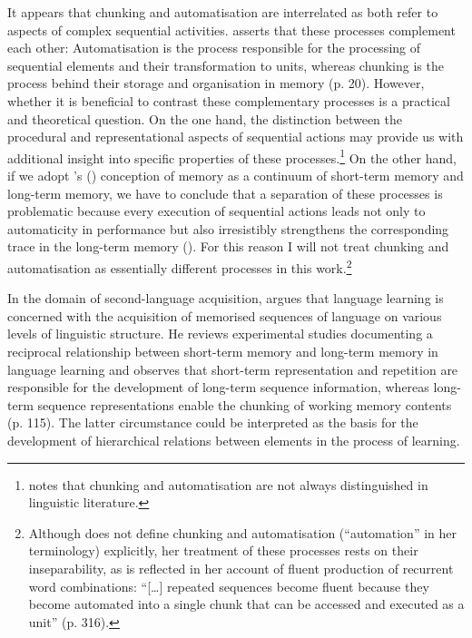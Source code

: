 \noindent It appears that chunking and automatisation are interrelated as both refer to aspects of complex sequential activities. \citeauthor{diessel-toappear} asserts that these processes complement each other: Automatisation is the process responsible for the processing of sequential elements and their transformation to units, whereas chunking is the process behind their storage and organisation in memory (p. 20). However, whether it is beneficial to contrast these complementary processes is a practical and theoretical question. On the one hand, the distinction between the procedural and representational aspects of sequential actions may provide us with additional insight into specific properties of these processes.\footnote{\citet{diessel-toappear} notes that chunking and automatisation are not always distinguished in linguistic literature.} On the other hand, if we adopt \citeauthor{melton-1963}'s (\citeyear[][]{melton-1963}) conception of memory as a continuum of short-term memory and long-term memory, we have to conclude that a separation of these processes is problematic because every execution of sequential actions leads not only to automaticity in performance but also irresistibly strengthens the corresponding trace in the long-term memory (\citealt[cf.][1046]{hay-2001}). For this reason I will not treat chunking and automatisation as essentially different processes in this work.\footnote{Although \citet{bybee-constituency-2002} does not define chunking and automatisation (“automation” in her terminology) explicitly, her treatment of these processes rests on their inseparability, as is reflected in her account of fluent production of recurrent word combinations: ``[\dots] repeated sequences become fluent because they become automated into a single chunk that can be accessed and executed as a unit'' (p. 316).}

In the domain of second-language acquisition, \citet{ellis-1996} argues that language learning is concerned with the acquisition of memorised sequences of language on various levels of linguistic structure. He reviews experimental studies documenting a reciprocal relationship between short-term memory and long-term memory in language learning and observes that short-term representation and repetition are responsible for the development of long-term sequence information, whereas long-term sequence representations enable the chunking of working memory contents (p. 115). The latter circumstance could be interpreted as the basis for the development of hierarchical relations between elements in the process of learning. 

